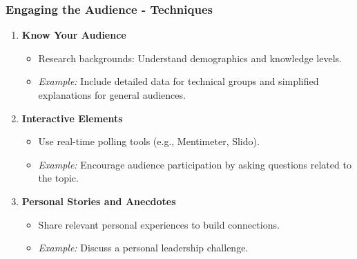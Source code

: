 \documentclass[aspectratio=169]{beamer}
\begin{document}
\begin{frame}[fragile]
    \frametitle{Engaging the Audience - Techniques}
    \begin{enumerate}
        \item \textbf{Know Your Audience}
            \begin{itemize}
                \item Research backgrounds: Understand demographics and knowledge levels.
                \item \textit{Example:} Include detailed data for technical groups and simplified explanations for general audiences.
            \end{itemize}
        \item \textbf{Interactive Elements}
            \begin{itemize}
                \item Use real-time polling tools (e.g., Mentimeter, Slido).
                \item \textit{Example:} Encourage audience participation by asking questions related to the topic.
            \end{itemize}
        \item \textbf{Personal Stories and Anecdotes}
            \begin{itemize}
                \item Share relevant personal experiences to build connections.
                \item \textit{Example:} Discuss a personal leadership challenge.
            \end{itemize}
    \end{enumerate}
\end{frame}
\end{document}
